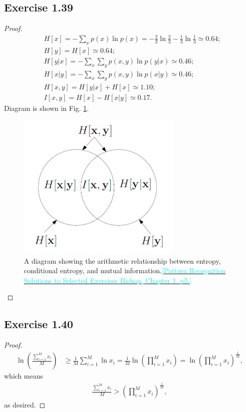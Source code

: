 \documentclass[11pt]{article}
\theoremstyle{definition}
\newcommand{\cyan}[1]{\textcolor{cyan}{#1}}
\begin{document}
\subsection{Exercise 1.39}
\begin{proof}
\begin{align*}
&H[x] = -\sum_{x}p(x)\ln p(x) = -\frac{2}{3}\ln \frac{2}{3} -\frac{1}{3}\ln \frac{1}{3} \simeq 0.64;\\
&H[y] = H[x] \simeq 0.64; \\
&H[y|x] =  -\sum_x\sum_yp(x,y)\ln p(y|x) \simeq 0.46;\\
&H[x|y] =  -\sum_x\sum_yp(x,y)\ln p(x|y) \simeq 0.46;\\
&H[x,y] = H[y|x] + H[x] \simeq 1.10; \\
&I[x,y] = H[x] - H[x|y] \simeq 0.17.
\end{align*}
Diagram is shown in Fig. \ref{fig:fig1}.
\begin{figure}[!hbtp] 
\centering 
\includegraphics[width=0.7\textwidth]{./res/ch1-ex39.png} 
\caption{A diagram showing the arithmetic relationship between entropy, conditional entropy, and mutual information.\href{http://www.cs.uu.nl/docs/vakken/mpr/exercises/pr-prml-uitwerkingen1.pdf}{\cyan{[Pattern Recognition Solutions to Selected Exercises Bishop, Chapter 1. p5.]}}} 
\label{fig:fig1} 
\end{figure}
\end{proof}

\subsection{Exercise 1.40}
\begin{proof}
\begin{align*}
\ln\left(\frac{\sum_{i=1}^Mx_i}{M}\right) &\geq \frac{1}{M}\sum_{i=1}^M\ln x_i 
= \frac{1}{M}\ln\left(\prod_{i=1}^Mx_i\right) 
= \ln\left(\prod_{i=1}^Mx_i\right)^{\frac{1}{M}},
\end{align*}
which means
\begin{align*}
\frac{\sum_{i=1}^Mx_i}{M} > \left(\prod_{i=1}^Mx_i\right)^{\frac{1}{M}},
\end{align*}
as desired.
\end{proof}
\end{document}
